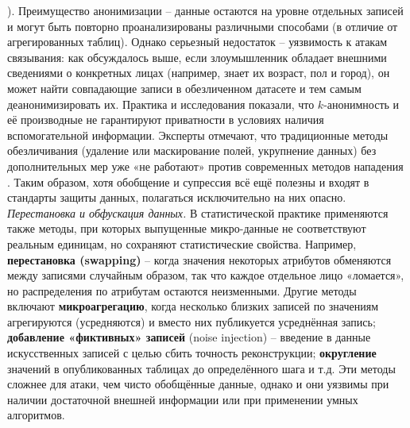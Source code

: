 ). Преимущество анонимизации – данные остаются на уровне отдельных записей и могут быть повторно проанализированы различными способами (в отличие от агрегированных таблиц). Однако серьезный недостаток – уязвимость к атакам связывания: как обсуждалось выше, если злоумышленник обладает внешними сведениями о конкретных лицах (например, знает их возраст, пол и город), он может найти совпадающие записи в обезличенном датасете и тем самым деанонимизировать их. Практика и исследования показали, что $k$-анонимность и её производные не гарантируют приватности в условиях наличия вспомогательной информации. Эксперты отмечают, что традиционные методы обезличивания (удаление или маскирование полей, укрупнение данных) без дополнительных мер уже «не работают» против современных методов нападения \autocite{cornell-edu}. Таким образом, хотя обобщение и супрессия всё ещё полезны и входят в стандарты защиты данных, полагаться исключительно на них опасно. \textit{Перестановка и обфускация данных.} В статистической практике применяются также методы, при которых выпущенные микро-данные не соответствуют реальным единицам, но сохраняют статистические свойства. Например, \textbf{перестановка (swapping)} – когда значения некоторых атрибутов обменяются между записями случайным образом, так что каждое отдельное лицо «ломается», но распределения по атрибутам остаются неизменными. Другие методы включают \textbf{микроагрегацию}, когда несколько близких записей по значениям агрегируются (усредняются) и вместо них публикуется усреднённая запись; \textbf{добавление «фиктивных» записей} (noise injection) – введение в данные искусственных записей с целью сбить точность реконструкции; \textbf{округление} значений в опубликованных таблицах до определённого шага и т.д. Эти методы сложнее для атаки, чем чисто обобщённые данные, однако и они уязвимы при наличии достаточной внешней информации или при применении умных алгоритмов.

